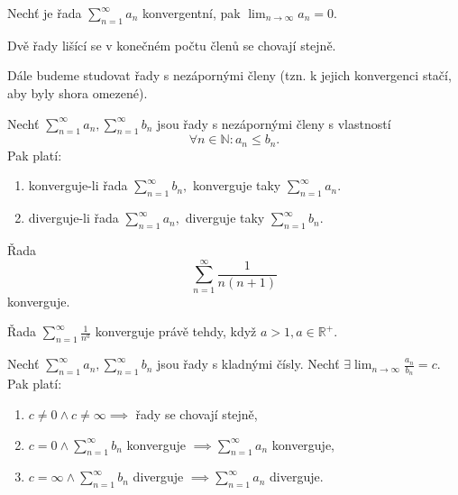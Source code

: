 \begin{veta}
    Nechť je řada $\sum_{n=1}^\infty a_n$ konvergentní, pak $\lim_{n\to\infty} a_n=0.$
\end{veta}

\begin{veta}
    Dvě řady lišící se v konečném počtu členů se chovají stejně.
\end{veta}

\begin{pozn}
    Dále budeme studovat řady s nezápornými členy (tzn. k jejich konvergenci stačí, aby byly shora omezené).
\end{pozn}

\begin{veta}
Nechť $\sum_{n=1}^\infty a_n, \sum_{n=1}^\infty b_n$ jsou řady s nezápornými členy
s vlastností
$$\forall n \in \mathbb N: a_n \leq b_n.$$
Pak platí:
\begin{enumerate}[$i.$]
\item konverguje-li řada $\sum_{n=1}^\infty b_n,$ konverguje taky $\sum_{n=1}^\infty a_n.$
\item diverguje-li řada $\sum_{n=1}^\infty a_n,$ diverguje taky $\sum_{n=1}^\infty b_n.$
\end{enumerate}
\end{veta}

\begin{pozn}
    Řada
    $$\sum_{n=1}^\infty \frac{1}{n(n+1)}$$
    konverguje.
\end{pozn}

\begin{veta}
    Řada $\sum_{n=1}^\infty \frac{1}{n^a}$ konverguje právě tehdy, když $a>1, a\in \mathbb R^+.$
\end{veta}

\begin{veta}
Nechť $\sum_{n=1}^\infty a_n, \sum_{n=1}^\infty b_n$ jsou řady s kladnými čísly.
Nechť $\exists \lim_{n\to\infty}\frac{a_n}{b_n}=c.$ Pak platí:
\begin{enumerate}[$i.$]
\item $c\ne 0\land c\ne \infty \implies$ řady se chovají stejně,
\item $c=0 \land \sum_{n=1}^\infty b_n$ konverguje $\implies \sum_{n=1}^\infty a_n$ konverguje,
\item $c=\infty \land \sum_{n=1}^\infty b_n$ diverguje $\implies \sum_{n=1}^\infty a_n$ diverguje.
\end{enumerate}
\end{veta}

